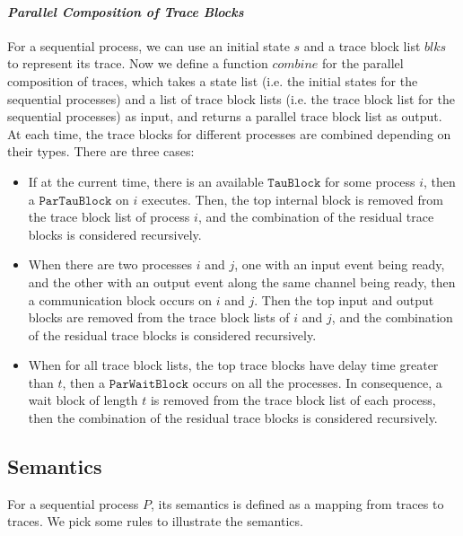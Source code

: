 \documentclass{llncs}
\newcommand{\blks}{\mathit{blks}}
\newcommand{\combine}{\mathit{combine}}
\begin{document}
\paragraph{\textbf{\emph{Parallel Composition of Trace Blocks}}}
For a sequential process, we can use an initial state $s$ and a trace block list $\blks$ to represent its trace. Now we define a function $\combine$ for the parallel composition of traces, which takes a state list (i.e. the initial states for the sequential processes) and a list of trace block lists (i.e. the trace block list for the sequential processes) as input, and returns a parallel trace block list as output. At each time, the trace blocks for different processes are combined depending on their types. There are three cases:

\begin{itemize}
 \item If at the current time, there is an available $\mathtt{TauBlock}$ for some process $i$, then a $\mathtt{ParTauBlock}$ on $i$ executes. Then, the top internal block is removed from the trace block list of process $i$, and the combination of the residual trace blocks is considered recursively.

 \item When there are two processes $i$ and $j$, one with an input event being ready, and the other with an output event along the same channel being ready, then a communication block occurs on $i$ and $j$. Then the top input and output blocks are removed from the trace block lists of $i$ and $j$, and the combination of the residual trace blocks is considered recursively.

 \item When for all trace block lists, the top trace blocks have delay time greater than $t$, then a $\mathtt{ParWaitBlock}$ occurs on all the processes. In consequence, a wait block of length $t$ is removed from the trace block list of each process, then the combination of the residual trace blocks is considered recursively.
\end{itemize}
  
\subsection{Semantics}
 
For a sequential process $P$, its semantics is defined as a mapping from traces to traces. We pick some rules to illustrate the semantics. 
\end{document}

